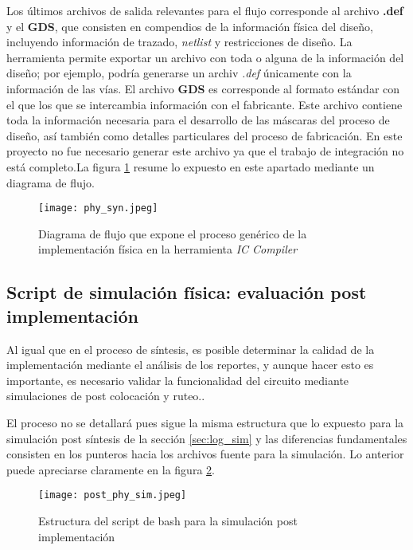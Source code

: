 Los últimos archivos de salida relevantes para el flujo corresponde al archivo \textbf{.def} y el \textbf{GDS}, que consisten en compendios de la información física del diseño, incluyendo información de trazado, \textit{netlist} y restricciones de diseño. La herramienta permite exportar un archivo con toda o alguna de la información del diseño; por ejemplo, podría generarse un archiv \textit{.def} únicamente con la información de las vías. El archivo \textbf{GDS} es corresponde al formato estándar con el que los que se intercambia información con el fabricante. Este archivo contiene toda la información necesaria para el desarrollo de las máscaras del proceso de diseño, así también como detalles particulares del proceso de fabricación. En este proyecto no fue necesario generar este archivo ya que el trabajo de integración no está completo.La figura \ref{fig:phy_script} resume lo expuesto en este apartado mediante un diagrama de flujo.

\begin{figure}[ht]
\texttt{[image: phy\_syn.jpeg]}
\centering
\caption{Diagrama de flujo que expone el proceso genérico de la implementación física en la herramienta \textit{IC Compiler}}
\label{fig:phy_script}
\end{figure}

\subsection{Script de simulación física: evaluación post implementación}

Al igual que en el proceso de síntesis, es posible determinar la calidad de la implementación mediante el análisis de los reportes, y aunque hacer esto es importante, es necesario validar la funcionalidad del circuito mediante simulaciones de post colocación y ruteo..

El proceso no se detallará pues sigue la misma estructura que lo expuesto para la simulación post síntesis de la sección \ref{sec:log_sim} y las diferencias fundamentales consisten en los punteros hacia los archivos fuente para la simulación. Lo anterior puede apreciarse claramente en la figura \ref{fig:phy_sim}.

\begin{figure}[ht]
\texttt{[image: post\_phy\_sim.jpeg]}
\centering
\caption{Estructura del script de bash para la simulación post implementación}
\label{fig:phy_sim}
\end{figure}

